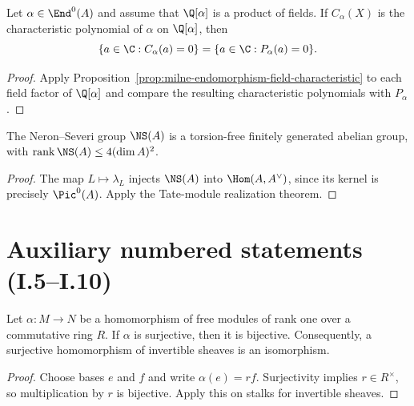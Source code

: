 \begin{corollary}
\label{cor:milne-characteristic-polynomial-roots}

Let $\alpha\in\End^0(A)$ and assume that $\Q[\alpha]$ is a product of fields.
If $C_\alpha(X)$ is the characteristic polynomial of $\alpha$ on $\Q[\alpha]$,
then
\[
\{a\in\C:C_\alpha(a)=0\}=\{a\in\C:P_\alpha(a)=0\}.
\]
\end{corollary}

\begin{proof}
Apply Proposition~\ref{prop:milne-endomorphism-field-characteristic} to
each field factor of $\Q[\alpha]$ and compare the resulting characteristic
polynomials with $P_\alpha$.
\end{proof}

\begin{corollary}
\label{cor:milne-ns-finite-rank}

The Neron--Severi group $\NS(A)$ is a torsion-free finitely generated abelian
group, with
$\operatorname{rank}\NS(A)\leq 4(\dim A)^2$.
\end{corollary}

\begin{proof}
The map $L\mapsto\lambda_L$ injects $\NS(A)$ into
$\Hom(A,A^\vee)$, since its kernel is precisely $\Pic^0(A)$.  Apply the
Tate-module realization theorem.
\end{proof}


\section*{Auxiliary numbered statements (I.5--I.10)}

\begin{lemma}
\label{lem:milne-5-8}

Let $\alpha:M\to N$ be a homomorphism of free modules of rank one over a
commutative ring $R$.  If $\alpha$ is surjective, then it is bijective.
Consequently, a surjective homomorphism of invertible sheaves is an
isomorphism.
\end{lemma}

\begin{proof}

Choose bases $e$ and $f$ and write $\alpha(e)=rf$.  Surjectivity implies
$r\in R^\times$, so multiplication by $r$ is bijective.  Apply this on
stalks for invertible sheaves.

\end{proof}


